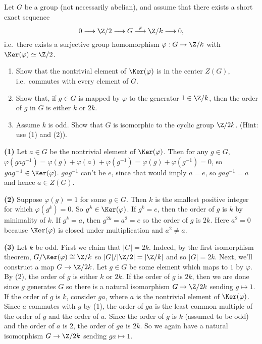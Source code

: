 \begin{problem}
Let $G$ be a group (not necessarily abelian), and assume that there exists a short exact sequence $$0\longrightarrow \Z/2\longrightarrow G \stackrel{\varphi}{\longrightarrow} \Z/k\longrightarrow 0,$$ i.e.\ there exists a surjective group homomorphism $\varphi:G\to \Z/k$ with $\Ker(\varphi)\simeq \Z/2$.
\begin{enumerate}
  \item Show that the nontrivial element of $\Ker(\varphi)$ is in the center $Z(G)$, i.e.\ commutes with every element of $G$.
  \item Show that, if $g\in G$ is mapped by $\varphi$ to the generator $1\in \Z/k$, then the order of $g$ in $G$ is either $k$ or $2k$.
  \item Assume $k$ is odd. Show that $G$ is isomorphic to the cyclic group $\Z/2k$. (Hint: use (1) and (2)).
\end{enumerate}
\end{problem}
\textbf{(1)} Let $a\in G$ be the nontrivial element of $\Ker(\varphi)$. Then for any $g\in G$, $\varphi(gag^{-1})=\varphi(g)+\varphi(a)+\varphi(g^{-1})=\varphi(g)+\varphi(g^{-1})=0$, so $gag^{-1}\in \Ker(\varphi)$. $gag^{-1}$ can't be $e$, since that would imply $a=e$, so $gag^{-1}=a$ and hence $a\in Z(G)$.

\textbf{(2)} Suppose $\varphi(g)=1$ for some $g\in G$. Then $k$ is the smallest positive integer for which $\varphi(g^k)=0$. So $g^k\in \Ker(\varphi)$. If $g^k=e$, then the order of $g$ is $k$ by minimality of $k$. If $g^k=a$, then $g^{2k}=a^2=e$ so the order of $g$ is $2k$. Here $a^2=0$ because $\Ker(\varphi)$ is closed under multiplication and $a^2\neq a$.

\textbf{(3)} Let $k$ be odd. First we claim that $|G|=2k$. Indeed, by the first isomorphism theorem, $G/\Ker(\varphi)\cong \Z/k$ so $|G|/|\Z/2|=|\Z/k|$ and so $|G|=2k$. Next, we'll construct a map $G\to \Z/2k$. Let $g\in G$ be some element which maps to $1$ by $\varphi$. By (2), the order of $g$ is either $k$ or $2k$. If the order of $g$ is $2k$, then we are done since $g$ generates $G$ so there is a natural isomorphism $G\to \Z/2k$ sending $g\mapsto 1$. If the order of $g$ is $k$, consider $ga$, where $a$ is the nontrivial element of $\Ker(\varphi)$. Since $a$ commutes with $g$ by (1), the order of $ga$ is the least common multiple of the order of $g$ and the order of $a$. Since the order of $g$ is $k$ (assumed to be odd) and the order of $a$ is $2$, the order of $ga$ is $2k$. So we again have a natural isomorphism $G \to \Z/2k$ sending $ga\mapsto 1$.    